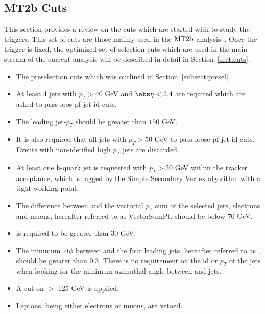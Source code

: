 \subsection{MT2b Cuts}
\label{subsect:mt2bcuts}
This section provides a review on the cuts which are started with to study the triggers. This set of cuts are those mainly used in the $\rm MT2b$ analysis~\cite{MT2_2011}. Once the trigger is fixed, the optimized set of selection cuts which are used in the main stream of the current analysis will be described in detail in Section~\ref{sect:cuts}.
\begin{itemize}
\item The preselection cuts which was outlined in Section~\ref{subsect:presel}.
\item At least 4 jets with $p_T>40$ GeV and $\abs\eta<2.4$ are required which are asked to pass loos pf-jet id cuts.
\item The leading jet-$p_T$ should be greater than $150$ GeV.
\item It is also required that all jets with $p_T>50$ GeV to pass loose pf-jet id cuts. Events with non-idetified high $p_T$ jets are discarded.
\item At least one b-quark jet is requested with $p_T>20$ GeV within the tracker acceptance, which is tagged by the Simple Secondary Vertex algorithm with a tight working point.
\item The difference between \met and the vectorial $p_T$ sum of the selected jets, electrons and muons, hereafter referred to as VectorSumPt, should be below $70$ GeV.
\item \met is required to be greater than $30$ GeV.
\item The minimum $\Delta\phi$ between \met and the four leading jets, hereafter referred to as \mindphifour, should be greater than $0.3$. There is no requirement on the id or $p_T$ of the jets when looking for the minimum azimuthal angle between \met and jets.
\item A cut on \mttwo $>$ 125 GeV is applied.
\item Leptons, being either electrons or muons, are vetoed.
\end{itemize}


